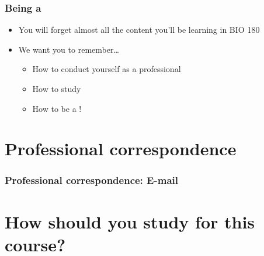 \begin{noheadline}
\begin{frame}
    \frametitle{Being a }
    \begin{itemize}[<+->]
        \item You will forget almost all the content you'll be learning in BIO 180
        \item We want you to remember\ldots
            \begin{itemize}
                \item How to conduct yourself as a professional
                \item How to study
                \item How to be a !
            \end{itemize}
    \end{itemize}
\end{frame}
\end{noheadline}

\section{Professional correspondence}

\begin{noheadline}
\begin{frame}
    \frametitle{Professional correspondence: E-mail}





\end{frame}
\end{noheadline}

\section{How should you study for this course?}

